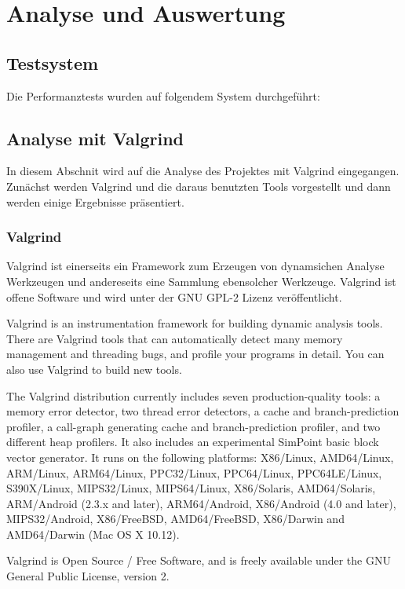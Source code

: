 \chapter{Analyse und Auswertung}


\section{Testsystem}

Die Performanztests wurden auf folgendem System durchgeführt:


\section{Analyse mit Valgrind}

In diesem Abschnit wird auf die Analyse des Projektes mit Valgrind eingegangen. Zunächst werden Valgrind und die daraus benutzten Tools vorgestellt und dann werden einige Ergebnisse präsentiert.
\subsection{Valgrind}

Valgrind ist einerseits ein Framework zum Erzeugen von dynamsichen Analyse Werkzeugen und andereseits eine Sammlung ebensolcher Werkzeuge. 
Valgrind ist offene Software und wird unter der GNU GPL-2 Lizenz veröffentlicht\cite{valgrind}.

Valgrind is an instrumentation framework for building dynamic analysis tools. There are Valgrind tools that can automatically detect many memory management and threading bugs, and profile your programs in detail. You can also use Valgrind to build new tools.

The Valgrind distribution currently includes seven production-quality tools: a memory error detector, two thread error detectors, a cache and branch-prediction profiler, a call-graph generating cache and branch-prediction profiler, and two different heap profilers. It also includes an experimental SimPoint basic block vector generator. It runs on the following platforms: X86/Linux, AMD64/Linux, ARM/Linux, ARM64/Linux, PPC32/Linux, PPC64/Linux, PPC64LE/Linux, S390X/Linux, MIPS32/Linux, MIPS64/Linux, X86/Solaris, AMD64/Solaris, ARM/Android (2.3.x and later), ARM64/Android, X86/Android (4.0 and later), MIPS32/Android, X86/FreeBSD, AMD64/FreeBSD, X86/Darwin and AMD64/Darwin (Mac OS X 10.12).

Valgrind is Open Source / Free Software, and is freely available under the GNU General Public License, version 2.


